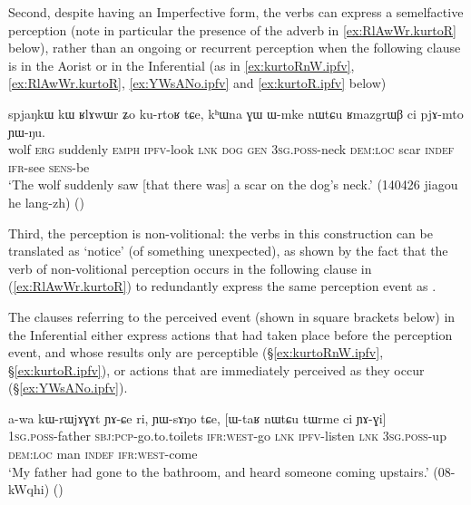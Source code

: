 Second, despite having an Imperfective form, the verbs can express a semelfactive perception (note in particular the presence of the adverb  in \ref{ex:RlAwWr.kurtoR} below), rather than an ongoing or recurrent perception when the following clause is in the Aorist or in the Inferential (as in \ref{ex:kurtoRnW.ipfv}, \ref{ex:RlAwWr.kurtoR}, \ref{ex:YWsANo.ipfv} and \ref{ex:kurtoR.ipfv} below)  

\begin{exe}
\ex \label{ex:RlAwWr.kurtoR}
\gll spjaŋkɯ kɯ ʁlɤwɯr ʑo ku-rtoʁ tɕe, kʰɯna ɣɯ ɯ-mke nɯtɕu ʁmazgrɯβ ci pjɤ-mto ɲɯ-ŋu.  \\
wolf \textsc{erg} suddenly \textsc{emph} \textsc{ipfv}-look \textsc{lnk} \textsc{dog} \textsc{gen} \textsc{3sg}.\textsc{poss}-neck \textsc{dem}:\textsc{loc} scar \textsc{indef} \textsc{ifr}-see \textsc{sens}-be \\
\glt `The wolf suddenly saw [that there was] a scar on the dog's neck.' (140426 jiagou he lang-zh)
()
\end{exe}

Third, the perception is non-volitional: the verbs in this construction can be translated as `notice' (of something unexpected), as shown by the fact that the verb of non-volitional perception  occurs in the following clause in (\ref{ex:RlAwWr.kurtoR}) to redundantly express the same perception event as . 

The clauses referring to the perceived event (shown in square brackets below) in the Inferential either express actions that had taken place before the perception event, and whose results only are perceptible (§\ref{ex:kurtoRnW.ipfv}, §\ref{ex:kurtoR.ipfv}), or actions that are immediately perceived as they occur (§\ref{ex:YWsANo.ipfv}).


\begin{exe}
\ex \label{ex:YWsANo.ipfv}
\gll a-wa kɯ-rɯjɤɣɤt ɲɤ-ɕe ri, ɲɯ-sɤŋo tɕe, [ɯ-taʁ nɯtɕu tɯrme ci ɲɤ-ɣi]  \\
\textsc{1sg}.\textsc{poss}-father \textsc{sbj}:\textsc{pcp}-go.to.toilets \textsc{ifr}:\textsc{west}-go \textsc{lnk} \textsc{ipfv}-listen \textsc{lnk} \textsc{3sg}.\textsc{poss}-up \textsc{dem}:\textsc{loc} man \textsc{indef} \textsc{ifr}:\textsc{west}-come \\
\glt `My father had gone to the bathroom, and heard someone coming upstairs.' (08-kWqhi)
()
\end{exe}


